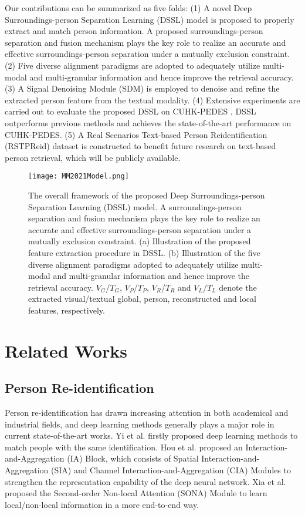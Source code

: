 \documentclass[sigconf]{acmart}
\begin{document}
Our contributions can be summarized as five folds: (1) A novel Deep Surroundings-person Separation Learning (DSSL) model is proposed to properly extract and match person information. A proposed surroundings-person separation and fusion mechanism plays the key role to realize an accurate and effective surroundings-person separation under a mutually exclusion constraint. (2) Five diverse alignment paradigms are adopted to adequately utilize multi-modal and multi-granular information and hence improve the retrieval accuracy. (3) A Signal Denoising Module (SDM) is employed to denoise and refine the extracted person feature from the textual modality. (4) Extensive experiments are carried out to evaluate the proposed DSSL on CUHK-PEDES \cite{Shuang2017Person}. DSSL outperforms previous methods and achieves the state-of-the-art performance on CUHK-PEDES. (5) A Real Scenarios Text-based Person Reidentification (RSTPReid) dataset is constructed to benefit future research on text-based person retrieval, which will be publicly available.

\begin{figure*}[h]
	\centering
	\texttt{[image: MM2021Model.png]}
	\caption{The overall framework of the proposed Deep Surroundings-person Separation Learning (DSSL) model. A surroundings-person separation and fusion mechanism plays the key role to realize an accurate and effective surroundings-person separation under a mutually exclusion constraint. (a) Illustration of the proposed feature extraction procedure in DSSL. (b) Illustration of the five diverse alignment paradigms adopted to adequately utilize multi-modal and multi-granular information and hence improve the retrieval accuracy. $V_{G}$/$T_{G}$, $V_{P}$/$T_{P}$, $V_{R}$/$T_{R}$ and $V_{L}$/$T_{L}$ denote the extracted visual/textual global, person, reconstructed and local features, respectively.}
	\label{fig:model}
\end{figure*}

\section{Related Works}
\subsection{Person Re-identification}
Person re-identification has drawn increasing attention in both academical and industrial fields, and deep learning methods generally plays a major role in current state-of-the-art works. Yi et al. \cite{yi2014deepreid} firstly proposed deep learning methods to match people with the same identification. Hou et al. \cite{IAM2019CVPR} proposed an Interaction-and-Aggregation (IA) Block, which consists of Spatial Interaction-and-Aggregation (SIA) and Channel Interaction-and-Aggregation (CIA) Modules to strengthen the representation capability of the deep neural network. Xia et al. \cite{SecondOrder2019} proposed the Second-order Non-local Attention (SONA) Module to learn local/non-local information in a more end-to-end way.
\end{document}
